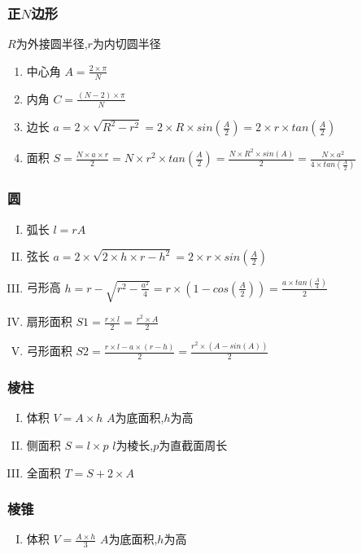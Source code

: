 \subsubsection{正$N$边形}
$R$为外接圆半径,$r$为内切圆半径
\begin{enumerate}
	\item 中心角 $A=\frac{2\times \pi}{N}$
	\item 内角 $C=\frac{(N-2)\times \pi}{N}$
	\item 边长 $a=2\times \sqrt{R^{2}-r^{2}}=2\times R\times sin(\frac{A}{2})=2\times r\times tan(\frac{A}{2})$
	\item 面积 $S=\frac{N\times a\times r}{2}=N\times r^{2}\times tan(\frac{A}{2})=\frac{N\times R^{2}\times sin(A)}{2}=\frac{N\times a^{2}}{4\times tan(\frac{A}{2})}$
\end{enumerate}
\subsubsection{圆}
\begin{enumerate}[I. ]
	\item 弧长 $l=rA$
	\item 弦长 $a=2\times \sqrt{2\times h\times r-h^{2}}=2\times r\times sin(\frac{A}{2})$
	\item 弓形高 $h=r-\sqrt{r^{2}-\frac{a^{2}}{4}}=r\times (1-cos(\frac{A}{2}))=\frac{a\times tan(\frac{A}{4})}{2}$
	\item 扇形面积 $S1=\frac{r\times l}{2}=\frac{r^{2}\times A}2$
	\item 弓形面积 $S2=\frac{r\times l-a\times(r-h)}{2}=\frac{r^{2}\times (A-sin(A))}{2}$
\end{enumerate}
\subsubsection{棱柱}
\begin{enumerate}[I. ]
	\item 体积 $V=A\times h$ $A$为底面积,$h$为高
	\item 侧面积 $S=l\times p$ $l$为棱长,$p$为直截面周长
	\item 全面积 $T=S+2\times A$
\end{enumerate}
\subsubsection{棱锥}
\begin{enumerate}[I. ]
	\item 体积 $V=\frac{A\times h}{3}$ $A$为底面积,$h$为高
\end{enumerate}
